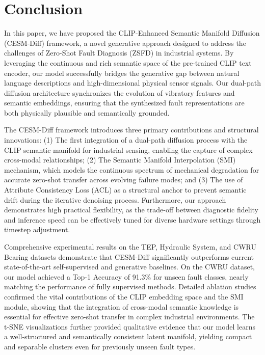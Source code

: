 \section{Conclusion}
\label{sec:conclusion}

In this paper, we have proposed the CLIP-Enhanced Semantic Manifold Diffusion (CESM-Diff) framework, a novel generative approach designed to address the challenges of Zero-Shot Fault Diagnosis (ZSFD) in industrial systems. By leveraging the continuous and rich semantic space of the pre-trained CLIP text encoder, our model successfully bridges the generative gap between natural language descriptions and high-dimensional physical sensor signals. Our dual-path diffusion architecture synchronizes the evolution of vibratory features and semantic embeddings, ensuring that the synthesized fault representations are both physically plausible and semantically grounded.

The CESM-Diff framework introduces three primary contributions and structural innovations: (1) The first integration of a dual-path diffusion process with the CLIP semantic manifold for industrial sensing, enabling the capture of complex cross-modal relationships; (2) The Semantic Manifold Interpolation (SMI) mechanism, which models the continuous spectrum of mechanical degradation for accurate zero-shot transfer across evolving failure modes; and (3) The use of Attribute Consistency Loss (ACL) as a structural anchor to prevent semantic drift during the iterative denoising process. Furthermore, our approach demonstrates high practical flexibility, as the trade-off between diagnostic fidelity and inference speed can be effectively tuned for diverse hardware settings through timestep adjustment.

Comprehensive experimental results on the TEP, Hydraulic System, and CWRU Bearing datasets demonstrate that CESM-Diff significantly outperforms current state-of-the-art self-supervised and generative baselines. On the CWRU dataset, our model achieved a Top-1 Accuracy of 91.3\% for unseen fault classes, nearly matching the performance of fully supervised methods. Detailed ablation studies confirmed the vital contributions of the CLIP embedding space and the SMI module, showing that the integration of cross-modal semantic knowledge is essential for effective zero-shot transfer in complex industrial environments. The t-SNE visualizations further provided qualitative evidence that our model learns a well-structured and semantically consistent latent manifold, yielding compact and separable clusters even for previously unseen fault types.

